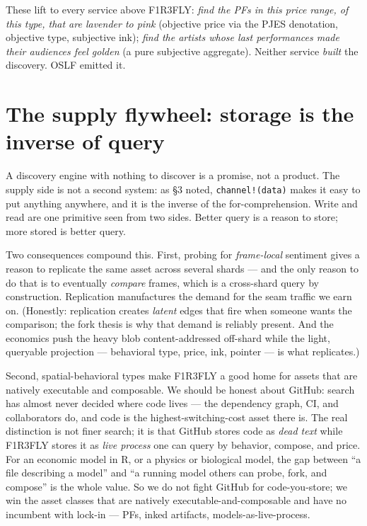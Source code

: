 \documentclass[11pt]{article}
\begin{document}
These lift to every service above F1R3FLY: \emph{find the PFs in this price range, of this type, that are lavender to pink} (objective price via the PJES denotation, objective type, subjective ink); \emph{find the artists whose last performances made their audiences feel golden} (a pure subjective aggregate). Neither service \emph{built} the discovery. OSLF emitted it.

\section{The supply flywheel: storage is the inverse of query}

A discovery engine with nothing to discover is a promise, not a product. The supply side is not a second system: as \S3 noted, \texttt{channel!(data)} makes it easy to put anything anywhere, and it is the inverse of the for-comprehension. Write and read are one primitive seen from two sides. Better query is a reason to store; more stored is better query.

Two consequences compound this. First, probing for \emph{frame-local} sentiment gives a reason to replicate the same asset across several shards --- and the only reason to do that is to eventually \emph{compare} frames, which is a cross-shard query by construction. Replication manufactures the demand for the seam traffic we earn on. (Honestly: replication creates \emph{latent} edges that fire when someone wants the comparison; the fork thesis is why that demand is reliably present. And the economics push the heavy blob content-addressed off-shard while the light, queryable projection --- behavioral type, price, ink, pointer --- is what replicates.)

Second, spatial-behavioral types make F1R3FLY a good home for assets that are natively executable and composable. We should be honest about GitHub: search has almost never decided where code lives --- the dependency graph, CI, and collaborators do, and code is the highest-switching-cost asset there is. The real distinction is not finer search; it is that GitHub stores code as \emph{dead text} while F1R3FLY stores it as \emph{live process} one can query by behavior, compose, and price. For an economic model in R, or a physics or biological model, the gap between ``a file describing a model'' and ``a running model others can probe, fork, and compose'' is the whole value. So we do not fight GitHub for code-you-store; we win the asset classes that are natively executable-and-composable and have no incumbent with lock-in --- PFs, inked artifacts, models-as-live-process.
\end{document}

